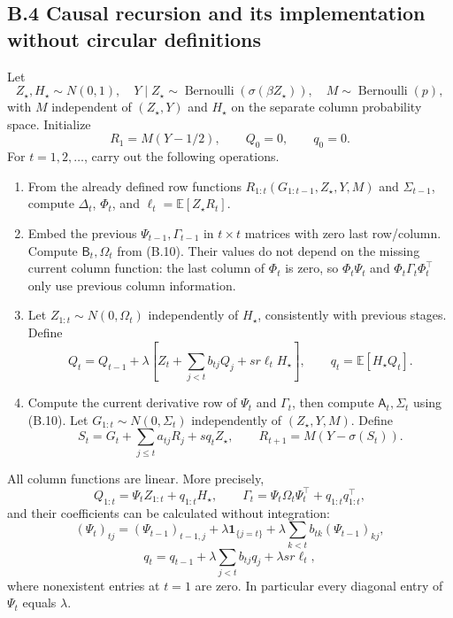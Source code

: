 \documentclass[
  11pt,
  a4paper,
]{article}
\providecommand{\tightlist}{%
  \setlength{\itemsep}{0pt}\setlength{\parskip}{0pt}}
\begin{document}
\hypertarget{b.4-causal-recursion-and-its-implementation-without-circular-definitions}{%
\subsection{B.4 Causal recursion and its implementation without circular
definitions}\label{b.4-causal-recursion-and-its-implementation-without-circular-definitions}}

Let \[
Z_\star,H_\star\sim N(0,1),\quad
Y\mid Z_\star\sim\operatorname{Bernoulli}(\sigma(\beta Z_\star)),
\quad M\sim\operatorname{Bernoulli}(p),
\] with \(M\) independent of \((Z_\star,Y)\) and \(H_\star\) on the
separate column probability space. Initialize \[
R_1=M(Y-1/2),\qquad Q_0=0,\qquad q_0=0.
\] For \(t=1,2,\ldots\), carry out the following operations.

\begin{enumerate}
\def\labelenumi{\arabic{enumi}.}
\tightlist
\item
  From the already defined row functions
  \(R_{1:t}(G_{1:t-1},Z_\star,Y,M)\) and \(\Sigma_{t-1}\), compute
  \(\Delta_t\), \(\Phi_t\), and \(\ell_t=\mathbb E[Z_\star R_t]\).
\item
  Embed the previous \(\Psi_{t-1},\Gamma_{t-1}\) in \(t\times t\)
  matrices with zero last row/column. Compute \(\mathsf B_t,\Omega_t\)
  from (B.10). Their values do not depend on the missing current column
  function: the last column of \(\Phi_t\) is zero, so \(\Phi_t\Psi_t\)
  and \(\Phi_t\Gamma_t\Phi_t^\top\) only use previous column
  information.
\item
  Let \(Z_{1:t}\sim N(0,\Omega_t)\) independently of \(H_\star\),
  consistently with previous stages. Define \[
  Q_t=Q_{t-1}+\lambda\left[Z_t+\sum_{j<t}b_{tj}Q_j+s r\ell_tH_\star\right],
  \qquad q_t=\mathbb E[H_\star Q_t].
  \tag{B.11}
  \]
\item
  Compute the current derivative row of \(\Psi_t\) and \(\Gamma_t\),
  then compute \(\mathsf A_t,\Sigma_t\) using (B.10). Let
  \(G_{1:t}\sim N(0,\Sigma_t)\) independently of \((Z_\star,Y,M)\).
  Define \[
  S_t=G_t+\sum_{j\le t}a_{tj}R_j+s q_tZ_\star,
  \qquad R_{t+1}=M(Y-\sigma(S_t)).
  \tag{B.12}
  \]
\end{enumerate}

All column functions are linear. More precisely, \[
Q_{1:t}=\Psi_tZ_{1:t}+q_{1:t}H_\star,\qquad
\Gamma_t=\Psi_t\Omega_t\Psi_t^\top+q_{1:t}q_{1:t}^\top,
\tag{B.13}
\] and their coefficients can be calculated without integration: \[
(\Psi_t)_{tj}=(\Psi_{t-1})_{t-1,j}
+\lambda\mathbf1_{\{j=t\}}+\lambda\sum_{k<t}b_{tk}(\Psi_{t-1})_{kj},
\] \[
q_t=q_{t-1}+\lambda\sum_{j<t}b_{tj}q_j+\lambda s r\ell_t,
\tag{B.14}
\] where nonexistent entries at \(t=1\) are zero. In particular every
diagonal entry of \(\Psi_t\) equals \(\lambda\).
\end{document}
